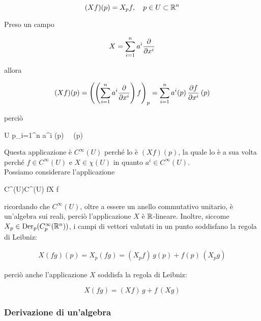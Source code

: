 \begin{equation}
	(X f) (p) = X_{p} f \qcomma p \in U \subset \R^{n}
\end{equation}

Preso un campo

\begin{equation}
	X = \sum_{i=1}^{n} a^{i} \pdv{x^{i}}
\end{equation}

allora

\begin{equation}
	(X f) (p) = \left( \left( \sum_{i=1}^{n} a^{i} \pdv{x^{i}} \right) f \right)_{p} %
	= \sum_{i=1}^{n} a^{i} (p) \, \pdv{f}{x^{i}} \, (p)
\end{equation}

perciò

	{U}{\R}
	{p}{\sum_{i=1}^{n} a^{i} (p) \,  \, (p)}

Questa applicazione è $ C^{\infty}(U) $ perché lo è $ (X f) (p) $, la quale lo è a sua volta perché $ f \in C^{\infty}(U) $ e $ X \in \chi(U) $ in quanto $ a^{i} \in C^{\infty}(U) $. \\
Possiamo considerare l'applicazione

	{C^{\infty}(U)}{C^{\infty}(U)}
	{f}{X f}

ricordando che $ C^{\infty}(U) $, oltre a essere un anello commutativo unitario, è un'algebra sui reali, perciò l'applicazione $ X $ è $ \mathbb{R} $-lineare. Inoltre, siccome $ X_{p} \in \operatorname{Der}_{p}(C_{p}^{\infty}(\mathbb{R}^{n})) $, i campi di vettori valutati in un punto soddisfano la regola di Leibniz:

\begin{align}
	X (f g) (p) = X_{p} (f g) = (X_{p} f) \, g(p) + f(p) \, (X_{p} g)
\end{align}

perciò anche l'applicazione $ X $ soddisfa la regola di Leibniz:

\begin{equation}
	X (f g) = (X f) \, g + f \, (X g)
\end{equation}

\subsubsection{Derivazione di un'algebra}

